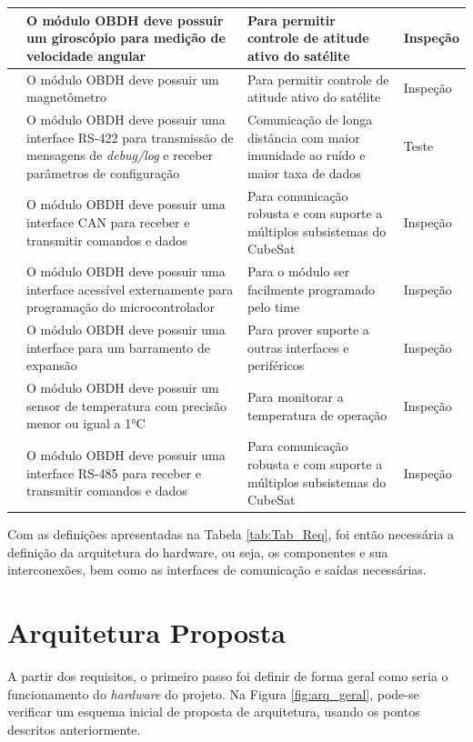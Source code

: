 \begin{longtable}{@{}>{\centering}p{1.5cm}p{4cm}p{4cm}p{4.7cm}@{}}
        \hline
        10 & O módulo OBDH deve possuir um giroscópio para medição de velocidade angular & Para permitir controle de atitude ativo do satélite  & Inspeção \tabularnewline 

       \hline
       11 & O módulo OBDH deve possuir um magnetômetro & Para permitir controle de atitude ativo do satélite  & Inspeção \tabularnewline

        \hline
        12 & O módulo OBDH deve possuir uma interface RS-422 para transmissão de mensagens de \textit{debug/log} e receber parâmetros de configuração & Comunicação de longa distância com maior imunidade ao ruído e maior taxa de dados  & Teste \tabularnewline

       \hline
       13 & O módulo OBDH deve possuir uma interface CAN para receber e transmitir comandos e dados & Para comunicação robusta e com suporte a múltiplos subsistemas do CubeSat  & Inspeção \tabularnewline

        \hline
        14 & O módulo OBDH deve possuir uma interface acessível externamente para programação do microcontrolador & Para o módulo ser facilmente programado pelo time  & Inspeção \tabularnewline

        \hline
        15 & O módulo OBDH deve possuir uma interface para um barramento de expansão & Para prover suporte a outras interfaces e periféricos  & Inspeção \tabularnewline

        \hline
       16 & O módulo OBDH deve possuir um sensor de temperatura com precisão menor ou igual a 1°C & Para monitorar a temperatura de operação & Inspeção\tabularnewline

        \hline
       17 & O módulo OBDH deve possuir uma interface RS-485 para receber e transmitir comandos e dados  & Para comunicação robusta e com suporte a múltiplos subsistemas do CubeSat & Inspeção \tabularnewline
       \hline
\end{longtable}
{}

Com as definições apresentadas na Tabela \ref{tab:Tab_Req}, foi então necessária a definição da arquitetura do hardware, ou seja, os componentes e sua interconexões, bem como as interfaces de comunicação e saídas necessárias.

\section{Arquitetura Proposta}

A partir dos requisitos, o primeiro passo foi definir de forma geral como seria o funcionamento do \textit{hardware} do projeto. Na Figura \ref{fig:arq_geral}, pode-se verificar um esquema inicial de proposta de arquitetura, usando os pontos descritos anteriormente.

